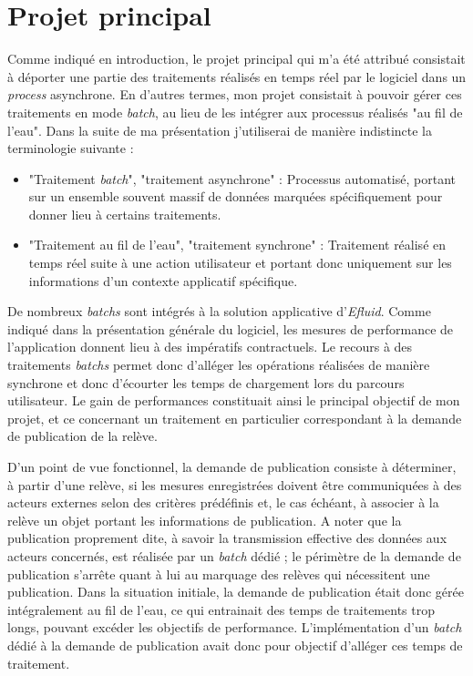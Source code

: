 \documentclass[a4paper, 12pt]{report}
\begin{document}
\section{Projet principal}

Comme indiqué en introduction, le projet principal qui m'a été attribué consistait à déporter une partie des traitements réalisés en temps réel par le logiciel dans un \textit{process} asynchrone. En d'autres termes, mon projet consistait à pouvoir gérer ces traitements en mode \textit{batch}, au lieu de les intégrer aux processus réalisés "au fil de l'eau". Dans la suite de ma présentation j'utiliserai de manière indistincte la terminologie suivante :\\

\begin{itemize}
  \item "Traitement \textit{batch}", "traitement asynchrone" : Processus automatisé, portant sur un ensemble souvent massif de données marquées spécifiquement pour donner lieu à certains traitements.
  \item "Traitement au fil de l'eau", "traitement synchrone" : Traitement réalisé en temps réel suite à une action utilisateur et portant donc uniquement sur les informations d'un contexte applicatif spécifique.
\end{itemize}
\vspace{0.5cm}

De nombreux \textit{batchs} sont intégrés à la solution applicative d'\textit{Efluid}. Comme indiqué dans la présentation générale du logiciel, les mesures de performance de l'application donnent lieu à des impératifs contractuels. Le recours à des traitements \textit{batchs} permet donc d'alléger les opérations réalisées de manière synchrone et donc d'écourter les temps de chargement lors du parcours utilisateur. Le gain de performances constituait ainsi le principal objectif de mon projet, et ce concernant un traitement en particulier correspondant à la demande de publication de la relève.

D'un point de vue fonctionnel, la demande de publication consiste à déterminer, à partir d'une relève, si les mesures enregistrées doivent être communiquées à des acteurs externes selon des critères prédéfinis et, le cas échéant, à associer à la relève un objet portant les informations de publication. A noter que la publication proprement dite, à savoir la transmission effective des données aux acteurs concernés, est réalisée par un \textit{batch} dédié ; le périmètre de la demande de publication s'arrête quant à lui au marquage des relèves qui nécessitent une publication. Dans la situation initiale, la demande de publication était donc gérée intégralement au fil de l'eau, ce qui entrainait des temps de traitements trop longs, pouvant excéder les objectifs de performance. L'implémentation d'un \textit{batch} dédié à la demande de publication avait donc pour objectif d'alléger ces temps de traitement.\\
\end{document}

